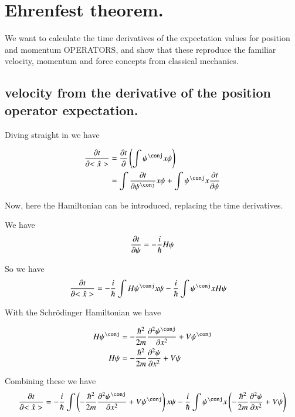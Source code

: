 \documentclass{article}
\newcommand{\PDSq}[2]{\frac{\partial^2 {#2}}{\partial {#1}^2}}
\begin{document}
\section{ Ehrenfest theorem. }

We want to calculate the time derivatives of the expectation values
for position and momentum OPERATORS, and show that these reproduce the
familiar velocity, momentum and force concepts from classical mechanics.

\subsection{ velocity from the derivative of the position operator expectation. }

Diving straight in we have

\begin{align*}
\PD{t}{<\hat{x}>}
&= \PD{t}{} \left( \int \psi^\conj x \psi \right) \\
&= \int \PD{t}{\psi^\conj} x \psi + \int \psi^\conj x \PD{t}{\psi} 
\end{align*}

Now, here the Hamiltonian can be introduced, replacing the time derivatives.

We have
\begin{align*}
\frac{\partial{t}}{\partial {\psi}} &= -\frac{i}{\hbar} H \psi \\
\end{align*}

So we have
\begin{align*}
\PD{t}{<\hat{x}>}
&= -\frac{i}{\hbar} \int H {\psi^\conj} x \psi - \frac{i}{\hbar}\int \psi^\conj x H {\psi} 
\end{align*}

With the Schr\"{o}dinger Hamiltonian we have

\begin{align*}
H \psi^\conj &= - \frac{\hbar^2}{2m} \PDSq{x}{\psi^\conj} + V\psi^\conj \\
H \psi &= - \frac{\hbar^2}{2m} \PDSq{x}{\psi} + V\psi \\
\end{align*}

Combining these we have
\begin{align*}
\PD{t}{<\hat{x}>}
&= 
-\frac{i}{\hbar} \int \left( - \frac{\hbar^2}{2m} \PDSq{x}{\psi^\conj} + V\psi^\conj \right) x \psi 
-\frac{i}{\hbar} \int \psi^\conj x \left(- \frac{\hbar^2}{2m} \PDSq{x}{\psi} + V\psi \right) \\
\end{align*}




\end{document}

